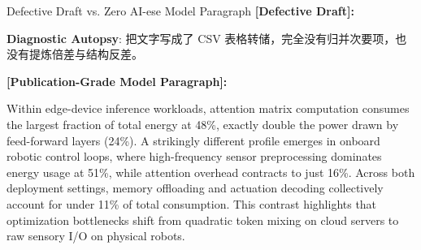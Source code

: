\begin{ExampleBox}{Defective Draft vs. Zero AI-ese Model Paragraph}
\textbf{\color{TargetHighlight}[Defective Draft]:}\par
{}\par\vspace{4pt}
\textbf{Diagnostic Autopsy}: 把文字写成了 CSV 表格转储，完全没有归并次要项，也没有提炼倍差与结构反差。\par\vspace{6pt}
\textbf{\color{AcadNavy}[Publication-Grade Model Paragraph]:}\par
Within edge-device inference workloads, attention matrix computation consumes the largest fraction of total energy at 48\%, exactly double the power drawn by feed-forward layers (24\%). A strikingly different profile emerges in onboard robotic control loops, where high-frequency sensor preprocessing dominates energy usage at 51\%, while attention overhead contracts to just 16\%. Across both deployment settings, memory offloading and actuation decoding collectively account for under 11\% of total consumption. This contrast highlights that optimization bottlenecks shift from quadratic token mixing on cloud servers to raw sensory I/O on physical robots.
\end{ExampleBox}
